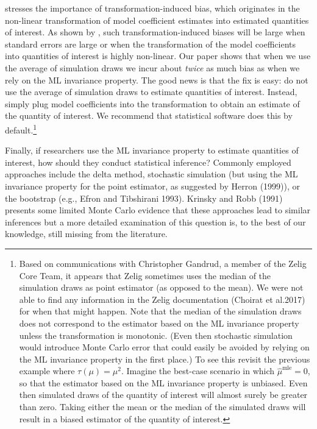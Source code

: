 \documentclass[11pt]{article}
\begin{document}
\cite{Rainey2017} stresses the importance of transformation-induced bias, which originates in the non-linear transformation of model coefficient estimates into estimated quantities of interest.
As shown by \cite{Rainey2017}, such transformation-induced biases will be large when standard errors are large or when the transformation of the model coefficients into quantities of interest is highly non-linear.
Our paper shows that when we use the average of simulation draws we incur about \textit{twice} as much bias as when we rely on the ML invariance property.
The good news is that the fix is easy: do not use the average of simulation draws to estimate quantities of interest.
Instead, simply plug model coefficients into the transformation to obtain an estimate of the quantity of interest.
We recommend that statistical software does this by default.\footnote{Based on communications with Christopher Gandrud, a member of the Zelig Core Team, it appears that Zelig sometimes uses the median of the simulation draws as point estimator (as opposed to the mean).
We were not able to find any information in the Zelig documentation (Choirat et al.\@ 2017) for when that might happen.
Note that the median of the simulation draws does not correspond to the estimator based on the ML invariance property unless the transformation is monotonic.
(Even then stochastic simulation would introduce Monte Carlo error that could easily be avoided by relying on the ML invariance property in the first place.) To see this revisit the previous example where $\tau(\mu) = \mu^2.$ Imagine the best-case scenario in which $\hat{\mu}^\text{mle} = 0$, so that the estimator based on the ML invariance property is unbiased.
Even then simulated draws of the quantity of interest will almost surely be greater than zero.
Taking either the mean or the median of the simulated draws will result in a biased estimator of the quantity of interest.}


Finally, if researchers use the ML invariance property to estimate quantities of interest, how should they conduct statistical inference? Commonly employed approaches include the delta method, stochastic simulation (but using the ML invariance property for the point estimator, as suggested by Herron (1999)), or the bootstrap (e.g., Efron and Tibshirani 1993).
Krinsky and Robb (1991) presents some limited Monte Carlo evidence that these approaches lead to similar inferences but a more detailed examination of this question is, to the best of our knowledge, still missing from the literature.

\singlespace
\small


\end{document}
